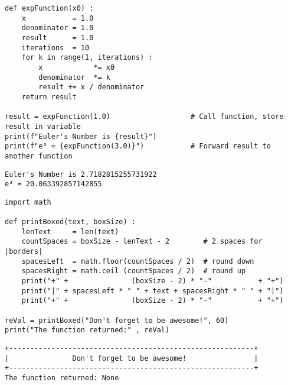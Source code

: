 
\begin{frame}[fragile]
%
\vspace{-5pt}
\begin{codebox}
\begin{verbatim}
def expFunction(x0) :
    x           = 1.0
    denominator = 1.0
    result      = 1.0
    iterations  = 10
    for k in range(1, iterations) :
        x            *= x0
        denominator  *= k
        result += x / denominator
    return result

result = expFunction(1.0)                   # Call function, store result in variable
print(f"Euler's Number is {result}")
print(f"e³ = {expFunction(3.0)}")           # Forward result to another function
\end{verbatim}
\end{codebox}

\begin{cmdbox}
\begin{verbatim}
Euler's Number is 2.7182815255731922
e³ = 20.063392857142855
\end{verbatim}
\end{cmdbox}
%
\end{frame}


\begin{frame}[fragile]
%
\vspace{-7pt}
\begin{codebox}
\begin{verbatim}
import math

def printBoxed(text, boxSize) :
    lenText     = len(text)
    countSpaces = boxSize - lenText - 2        # 2 spaces for |borders|
    spacesLeft  = math.floor(countSpaces / 2)  # round down
    spacesRight = math.ceil (countSpaces / 2)  # round up
    print("+" +               (boxSize - 2) * "-"           + "+")
    print("|" + spacesLeft * " " + text + spacesRight * " " + "|")
    print("+" +               (boxSize - 2) * "-"           + "+")

reVal = printBoxed("Don't forget to be awesome!", 60)
print("The function returned:" , reVal)
\end{verbatim}
\end{codebox}

\vspace{-12pt}
\begin{cmdbox}
\begin{verbatim}
+----------------------------------------------------------+
|               Don't forget to be awesome!                |
+----------------------------------------------------------+
The function returned: None
\end{verbatim}
\end{cmdbox}
%
\end{frame}

